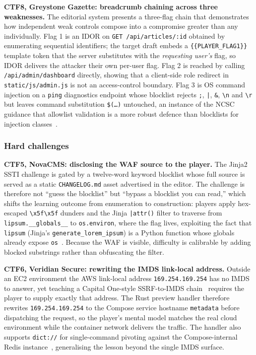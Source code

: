 \textbf{CTF8, Greystone Gazette: breadcrumb chaining
across three weaknesses.} The editorial system presents a
three-flag chain that demonstrates how independent weak
controls compose into a compromise greater than any
individually. Flag 1 is an IDOR on
\texttt{GET /api/articles/:id} obtained by enumerating
sequential identifiers; the target draft embeds a
\texttt{\{\{PLAYER\_FLAG1\}\}} template token that the
server substitutes with the \emph{requesting user's} flag,
so IDOR delivers the attacker their own per-user flag. Flag
2 is reached by calling \texttt{/api/admin/dashboard}
directly, showing that a client-side role redirect in
\texttt{static/js/admin.js} is not an access-control
boundary. Flag 3 is OS command injection on a \texttt{ping}
diagnostics endpoint whose blocklist rejects \texttt{;},
\texttt{|}, \texttt{\&}, \texttt{\textbackslash n} and
\texttt{\textbackslash r} but leaves command substitution
\texttt{\$(\ldots)} untouched, an instance of the NCSC
guidance that allowlist validation is a more robust defence
than blocklists for injection classes~\cite{NCSCInjection}.

\subsubsection{Hard challenges}

\textbf{CTF5, NovaCMS: disclosing the WAF source to the
player.} The Jinja2 SSTI challenge is gated by a
twelve-word keyword blocklist whose full source is served as
a static \texttt{CHANGELOG.md} asset advertised in the
editor. The challenge is therefore not ``guess the
blocklist'' but ``bypass a blocklist you can read,'' which
shifts the learning outcome from enumeration to
construction: players apply hex-escaped
\texttt{\textbackslash x5f\textbackslash x5f} dunders and
the Jinja \texttt{|attr()} filter to traverse from
\texttt{lipsum.\_\_globals\_\_} to \texttt{os.environ}, where
the flag lives, exploiting the fact that \texttt{lipsum}
(Jinja's \texttt{generate\_lorem\_ipsum}) is a Python
function whose globals already expose
\texttt{os}~\cite{JinjaMRO}. Because the WAF is visible,
difficulty is calibrable by adding blocked substrings rather
than obfuscating the filter.

\textbf{CTF6, Veridian Secure: rewriting the IMDS
link-local address.} Outside an EC2 environment the AWS
link-local address \texttt{169.254.169.254} has no IMDS to
answer, yet teaching a Capital One-style SSRF-to-IMDS
chain~\cite{khan2022} requires the player to supply exactly
that address. The Rust preview handler
therefore rewrites \texttt{169.254.169.254} to the Compose
service hostname \texttt{metadata} before dispatching the
request, so the player's mental model matches the real
cloud environment while the container network delivers the
traffic. The handler also supports \texttt{dict://} for
single-command pivoting against the Compose-internal Redis
instance~\cite{BurpSSRFRedis}, generalising the lesson beyond
the single IMDS surface.

